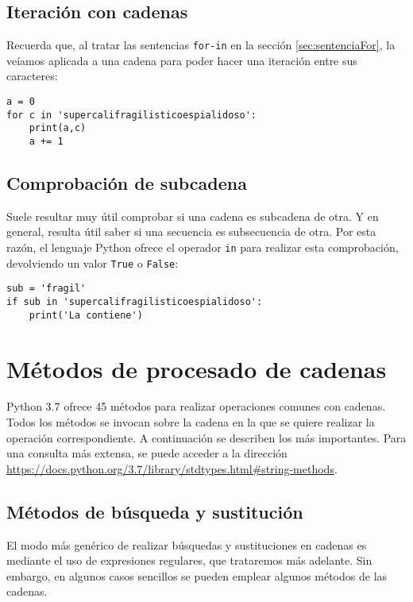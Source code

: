 \subsection{Iteración con cadenas}

Recuerda que, al tratar las sentencias \texttt{for-in} en la sección \ref{sec:sentenciaFor}, la veíamos aplicada a una cadena para poder hacer una iteración entre sus caracteres:

\begin{lstlisting}
a = 0
for c in 'supercalifragilisticoespialidoso':
	print(a,c)
	a += 1
\end{lstlisting}


\subsection{Comprobación de subcadena}

Suele resultar muy útil comprobar si una cadena es subcadena de otra. Y en general, resulta útil saber si una secuencia es subsecuencia de otra. Por esta razón, el lenguaje Python ofrece el operador \texttt{in} para realizar esta comprobación, devolviendo un valor \texttt{True} o \texttt{False}:

\begin{lstlisting}
sub = 'fragil'
if sub in 'supercalifragilisticoespialidoso':
    print('La contiene')
\end{lstlisting}

\section{Métodos de procesado de cadenas}

Python 3.7 ofrece 45 métodos para realizar operaciones comunes con cadenas. Todos los métodos se invocan sobre la cadena en la que se quiere realizar la operación correspondiente. A continuación se describen los más importantes. Para una consulta más extensa, se puede acceder a la dirección \url{https://docs.python.org/3.7/library/stdtypes.html#string-methods}.

\subsection{Métodos de búsqueda y sustitución}

El modo más genérico de realizar búsquedas y sustituciones en cadenas es mediante el uso de expresiones regulares, que trataremos más adelante. Sin embargo, en algunos casos sencillos se pueden emplear algunos métodos de las cadenas.

